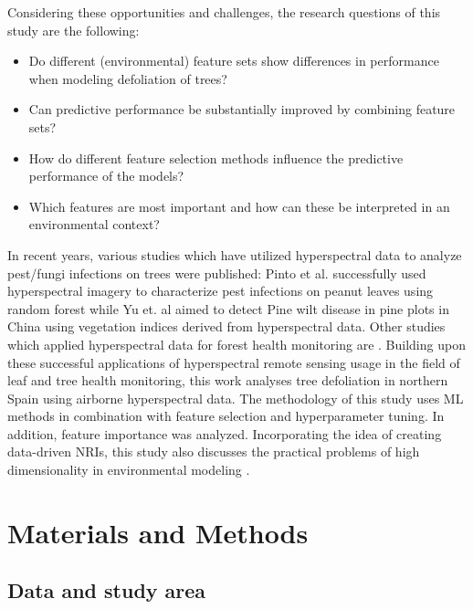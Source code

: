 \documentclass[remotesensing,article,submit,moreauthors,pdftex]{Definitions/mdpi}
\begin{document}
Considering these opportunities and challenges, the research questions of this study are the following:

\begin{itemize}

	\item Do different (environmental) feature sets show differences in performance when modeling defoliation of trees?

	\item Can predictive performance be substantially improved by combining feature sets?

	\item How do different feature selection methods influence the predictive performance of the models?

	\item Which features are most important and how can these be interpreted in an environmental context?

\end{itemize}

In recent years, various studies which have utilized hyperspectral data to analyze pest/fungi infections on trees were published:
Pinto et al. \citep{pinto2020} successfully used hyperspectral imagery to characterize pest infections on peanut leaves using random forest while Yu et. al \cite{yu2021} aimed to detect Pine wilt disease in pine plots in China using vegetation indices derived from hyperspectral data.
Other studies which applied hyperspectral data for forest health monitoring are \cite{lin2014,kayet2019,dash2017}.
Building upon these successful applications of hyperspectral remote sensing usage in the field of leaf and tree health monitoring, this work analyses tree defoliation in northern Spain using airborne hyperspectral data.
The methodology of this study uses ML methods in combination with feature selection and hyperparameter tuning.
In addition, feature importance was analyzed.
Incorporating the idea of creating data-driven \ac{NRI}s, this study also discusses the practical problems of high dimensionality in environmental modeling \cite{trunk1979, xu2016}.

\section{Materials and Methods}

\subsection{Data and study area}
\end{document}
